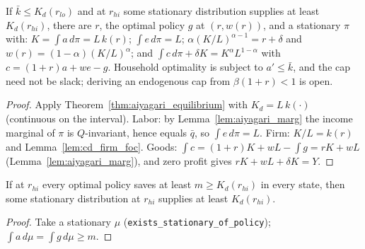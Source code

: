 \begin{theorem}
\label{thm:aiyagari_ge}
\leanok
{}
If $\bar k \le K_d(r_{lo})$ and at $r_{hi}$ some stationary distribution supplies at least $K_d(r_{hi})$, there are
$r$, the optimal policy $g$ at $(r,w(r))$, and a stationary $\pi$ with: $K = \int a\,d\pi = L\,k(r)$;
$\int e\,d\pi = L$; $\alpha(K/L)^{\alpha-1} = r+\delta$ and $w(r) = (1-\alpha)(K/L)^\alpha$; and
$\int c\,d\pi + \delta K = K^\alpha L^{1-\alpha}$ with $c = (1+r)a + we - g$. Household optimality is subject to
$a'\le\bar k$, and the cap need not be slack; deriving an endogenous cap from $\beta(1+r)<1$ is open.
\end{theorem}
\begin{proof}
\leanok
{}
Apply Theorem~\ref{thm:aiyagari_equilibrium} with $K_d = L\,k(\cdot)$ (continuous on the interval). Labor: by
Lemma~\ref{lem:aiyagari_marg} the income marginal of $\pi$ is $Q$-invariant, hence equals $\bar q$, so
$\int e\,d\pi = L$. Firm: $K/L = k(r)$ and Lemma~\ref{lem:cd_firm_foc}. Goods: $\int c = (1+r)K + wL - \int g =
rK + wL$ (Lemma~\ref{lem:aiyagari_marg}), and zero profit gives $rK + wL + \delta K = Y$.
\end{proof}

\begin{lemma}
\label{lem:hhi_of_le_policy}
\leanok
{}
If at $r_{hi}$ every optimal policy saves at least $m \ge K_d(r_{hi})$ in every state, then some stationary
distribution at $r_{hi}$ supplies at least $K_d(r_{hi})$.
\end{lemma}
\begin{proof}
\leanok
{}
Take a stationary $\mu$ (\texttt{exists\_stationary\_of\_policy}); $\int a\,d\mu = \int g\,d\mu \ge m$.
\end{proof}

